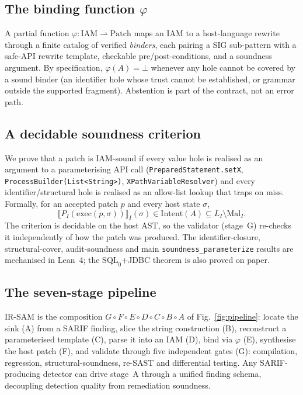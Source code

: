 \documentclass[conference]{IEEEtran}
\newcommand{\bottom}{\ensuremath{\bot}}
\newcommand{\irsam}{IR-SAM}
\newcommand{\code}[1]{\texttt{\small #1}}
\begin{document}
\subsection{The binding function $\varphi$}
A partial function
$\varphi:\mathrm{IAM}\rightharpoonup\mathrm{Patch}$ maps an IAM to a
host-language rewrite through a finite catalog of verified \emph{binders},
each pairing a SIG sub-pattern with a safe-API rewrite template, checkable
pre/post-conditions, and a soundness argument. By specification,
$\varphi(A)=\bottom$ whenever any hole cannot be covered by a sound binder
(an identifier hole whose trust cannot be established, or grammar outside
the supported fragment). Abstention is part of the contract, not an error
path.

\subsection{A decidable soundness criterion}
We prove that a patch is IAM-sound if every \textsf{value} hole is
realised as an argument to a parameterising API call
(\code{PreparedStatement.setX}, \code{ProcessBuilder(List<String>)},
\code{XPathVariableResolver}) and every
\textsf{identifier}/\textsf{structural} hole is realised as an allow-list
lookup that traps on miss. Formally, for an accepted patch $p$ and every
host state $\sigma$,
\begin{equation}
  \llbracket P_I(\mathrm{exec}(p,\sigma))\rrbracket_I(\sigma)
     \in \mathrm{Intent}(A) \subseteq L_I \setminus \mathrm{Mal}_I .
  \label{eq:soundness}
\end{equation}
The criterion is decidable on the host AST, so the validator (stage~G)
re-checks it independently of how the patch was produced. The
identifier-closure, structural-cover, audit-soundness and main
\code{soundness\_parameterize} results are mechanised in Lean~4; the
$\mathrm{SQL}_0$+JDBC theorem is also proved on paper.

\subsection{The seven-stage pipeline}
\irsam{} is the composition $G\circ F\circ E\circ D\circ C\circ B\circ A$
of Fig.~\ref{fig:pipeline}: locate the sink (A) from a SARIF finding,
slice the string construction (B), reconstruct a parameterised template
(C), parse it into an IAM (D), bind via $\varphi$ (E), synthesise the host
patch (F), and validate through five independent gates (G): compilation,
regression, structural-soundness, re-SAST and differential testing. Any
SARIF-producing detector can drive stage~A through a unified finding
schema, decoupling detection quality from remediation soundness.
\end{document}
